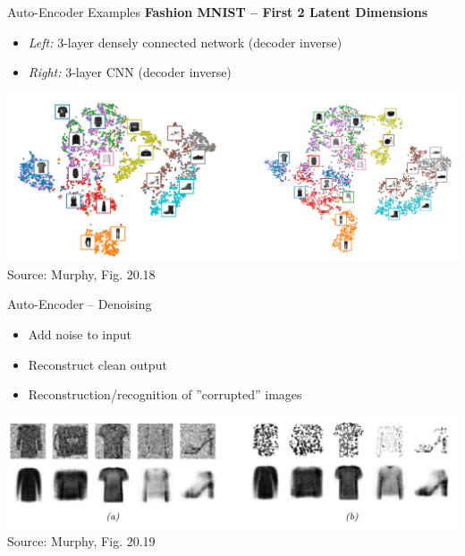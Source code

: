 \documentclass[ignorenonframetext,xcolor=x11names]{beamer}
\begin{document}
\begin{frame}{Auto-Encoder Examples}
\textbf{Fashion MNIST -- First 2 Latent Dimensions}
\begin{itemize}
   \item \emph{Left:} 3-layer densely connected network (decoder inverse)
   \item \emph{Right:} 3-layer CNN (decoder inverse)
\end{itemize} 

\begin{center}
\includegraphics[width=\textwidth]{murphy_20_18.png} \\

\scriptsize Source: Murphy, Fig. 20.18 \normalsize
\end{center}
\end{frame}


\begin{frame}{Auto-Encoder -- Denoising}
\begin{itemize}
   \item Add noise to input
   \item Reconstruct clean output
   \item Reconstruction/recognition of ''corrupted'' images
\end{itemize}
 
\begin{center}
\includegraphics[width=\textwidth]{murphy_20_19.png} \\

\scriptsize Source: Murphy, Fig. 20.19 \normalsize
\end{center}
\end{frame}
   
\end{document}
